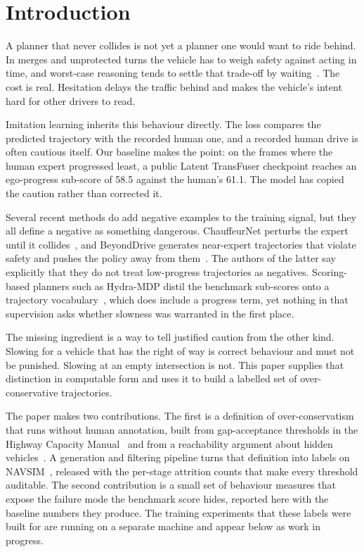 \documentclass[conference]{IEEEtran}
\begin{document}
\section{Introduction}

A planner that never collides is not yet a planner one would want to ride
behind. In merges and unprotected turns the vehicle has to weigh safety against
acting in time, and worst-case reasoning tends to settle that trade-off by
waiting~\cite{trautman2010,schwarting2019}. The cost is real. Hesitation delays
the traffic behind and makes the vehicle's intent hard for other drivers to
read.

Imitation learning inherits this behaviour directly. The loss compares the
predicted trajectory with the recorded human one, and a recorded human drive is
often cautious itself. Our baseline makes the point: on the frames where the
human expert progressed least, a public Latent TransFuser checkpoint reaches an
ego-progress sub-score of 58.5 against the human's 61.1. The model has copied
the caution rather than corrected it.

Several recent methods do add negative examples to the training signal, but they
all define a negative as something dangerous. ChauffeurNet perturbs the expert
until it collides~\cite{chauffeurnet}, and BeyondDrive generates near-expert
trajectories that violate safety and pushes the policy away from
them~\cite{beyonddrive}. The authors of the latter say explicitly that they do
not treat low-progress trajectories as negatives. Scoring-based planners such as
Hydra-MDP distil the benchmark sub-scores onto a trajectory
vocabulary~\cite{hydramdp,gtrs}, which does include a progress term, yet nothing
in that supervision asks whether slowness was warranted in the first place.

The missing ingredient is a way to tell justified caution from the other kind.
Slowing for a vehicle that has the right of way is correct behaviour and must
not be punished. Slowing at an empty intersection is not. This paper supplies
that distinction in computable form and uses it to build a labelled set of
over-conservative trajectories.

The paper makes two contributions. The first is a definition of
over-conservatism that runs without human annotation, built from gap-acceptance
thresholds in the Highway Capacity Manual~\cite{hcm6} and from a reachability
argument about hidden vehicles~\cite{orzechowski2018}. A generation and
filtering pipeline turns that definition into labels on NAVSIM~\cite{navsim},
released with the per-stage attrition counts that make every threshold
auditable. The second contribution is a small set of behaviour measures that
expose the failure mode the benchmark score hides, reported here with the
baseline numbers they produce. The training experiments that these labels were
built for are running on a separate machine and appear below as work in
progress.
\end{document}
